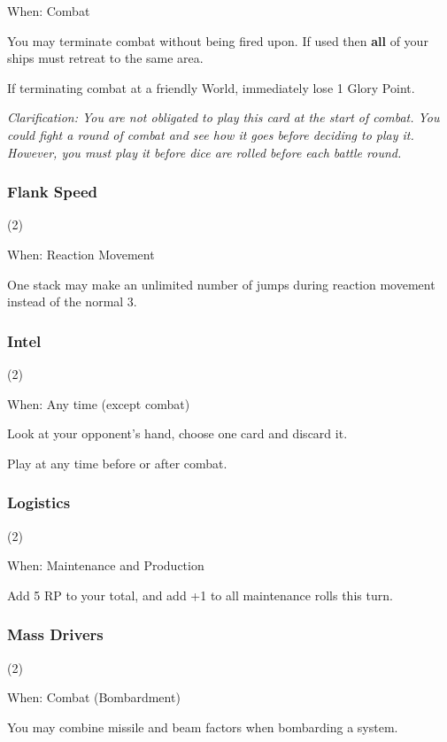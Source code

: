 When: Combat

You may terminate combat without being fired upon. If used then \textbf{all} of your ships must retreat to the same area.

If terminating combat at a friendly World, immediately lose 1 Glory Point.

\textit{Clarification: You are not obligated to play this card at the start of combat. You could fight a round of combat and see how it goes before deciding to play it. However, you must play it before dice are rolled before each battle round.}

\subsubsection{Flank Speed} (2)

When: Reaction Movement

One stack may make an unlimited number of jumps during reaction movement instead of the normal 3.

\subsubsection{Intel} (2)

When: Any time (except combat)

Look at your opponent's hand, choose one card and discard it.

Play at any time before or after combat.

\subsubsection{Logistics} (2)

When: Maintenance and Production

Add 5 RP to your total, and add +1 to all maintenance rolls this turn.

\subsubsection{Mass Drivers} (2)

When:  Combat (Bombardment)

You may combine missile and beam factors when bombarding a system.

